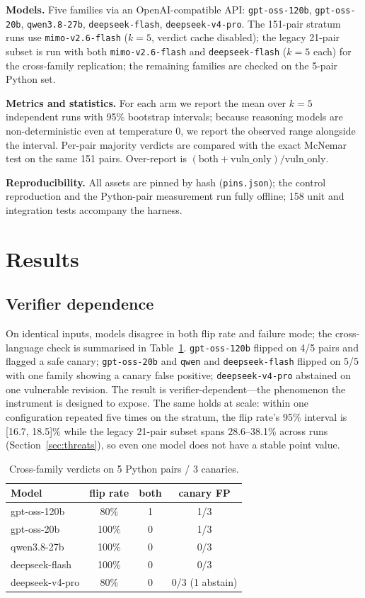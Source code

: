 \documentclass[conference]{IEEEtran}
\newcommand{\code}[1]{\texttt{#1}}
\begin{document}
\textbf{Models.} Five families via an OpenAI-compatible API: \code{gpt-oss-120b},
\code{gpt-oss-20b}, \code{qwen3.8-27b}, \code{deepseek-flash},
\code{deepseek-v4-pro}. The 151-pair stratum runs use \code{mimo-v2.6-flash}
($k{=}5$, verdict cache disabled); the legacy 21-pair subset is run with both
\code{mimo-v2.6-flash} and \code{deepseek-flash} ($k{=}5$ each) for the
cross-family replication; the remaining families are checked on the 5-pair
Python set.

\textbf{Metrics and statistics.} For each arm we report the mean over $k{=}5$
independent runs with 95\% bootstrap intervals; because reasoning models are
non-deterministic even at temperature 0, we report the observed range alongside
the interval. Per-pair majority verdicts are compared with the exact McNemar
test on the same 151 pairs. Over-report is
$(\text{both}+\text{vuln\_only})/\text{vuln\_only}$.

\textbf{Reproducibility.} All assets are pinned by hash (\code{pins.json}); the
control reproduction and the Python-pair measurement run fully offline; 158 unit and
integration tests accompany the harness.

\section{Results}
\label{sec:results}
\subsection{Verifier dependence}
On identical inputs, models disagree in both flip rate and failure mode; the
cross-language check is summarised in Table~\ref{tab:cross}. \code{gpt-oss-120b}
flipped on 4/5 pairs and flagged a safe canary; \code{gpt-oss-20b} and \code{qwen}
and \code{deepseek-flash} flipped on 5/5 with one family showing a canary false
positive; \code{deepseek-v4-pro} abstained on one vulnerable revision. The result is
verifier-dependent---the phenomenon the instrument is designed to expose. The same
holds at scale: within one configuration repeated five times on the stratum, the
flip rate's 95\% interval is [16.7, 18.5]\% while the legacy 21-pair subset spans
28.6--38.1\% across runs (Section~\ref{sec:threats}), so even one model does not
have a stable point value.

\begin{table}[t]
\centering
\caption{Cross-family verdicts on 5 Python pairs / 3 canaries.}
\label{tab:cross}
\small
\begin{tabular}{@{}lccc@{}}
\toprule
Model & flip rate & both & canary FP \\
\midrule
gpt-oss-120b & 80\% & 1 & 1/3 \\
gpt-oss-20b & 100\% & 0 & 1/3 \\
qwen3.8-27b & 100\% & 0 & 0/3 \\
deepseek-flash & 100\% & 0 & 0/3 \\
deepseek-v4-pro & 80\% & 0 & 0/3 (1 abstain) \\
\bottomrule
\end{tabular}
\end{table}
\end{document}
